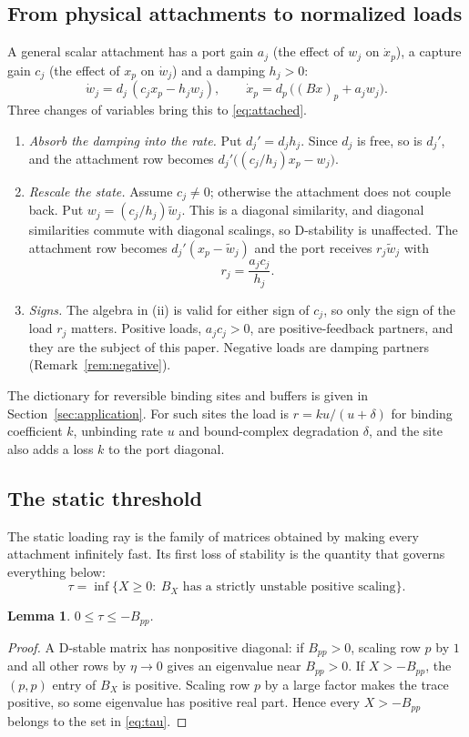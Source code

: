 \documentclass[11pt,a4paper]{article}
\theoremstyle{plain}
\newtheorem{lemma}[theorem]{Lemma}
\theoremstyle{definition}
\theoremstyle{remark}
\begin{document}
\subsection{From physical attachments to normalized loads}\label{sec:normalization}
A general scalar attachment has a port gain $a_j$ (the effect of $w_j$ on
$\dot x_p$), a capture gain $c_j$ (the effect of $x_p$ on $\dot w_j$) and a
damping $h_j>0$:
\[
 \dot w_j=d_j\,(c_jx_p-h_jw_j),\qquad \dot x_p=d_p\,\bigl((Bx)_p+a_jw_j\bigr).
\]
Three changes of variables bring this to \eqref{eq:attached}.
\begin{enumerate}[label=(\roman*)]
\item \emph{Absorb the damping into the rate.} Put $d_j'=d_jh_j$. Since $d_j$
is free, so is $d_j'$, and the attachment row becomes
$d_j'\bigl((c_j/h_j)x_p-w_j\bigr)$.
\item \emph{Rescale the state.} Assume $c_j\ne0$; otherwise the attachment
does not couple back. Put $w_j=(c_j/h_j)\tilde w_j$. This is a
diagonal similarity, and diagonal similarities commute with diagonal scalings,
so D-stability is unaffected. The attachment row becomes
$d_j'(x_p-\tilde w_j)$ and the port receives $r_j\tilde w_j$ with
\[
 r_j=\frac{a_jc_j}{h_j}.
\]
\item \emph{Signs.} The algebra in (ii) is valid for either sign of $c_j$, so
only the sign of the load $r_j$ matters. Positive loads,
$a_jc_j>0$, are positive-feedback partners, and they are the subject of this
paper. Negative loads are damping partners (Remark~\ref{rem:negative}).
\end{enumerate}
The dictionary for reversible binding sites and buffers is given in
Section~\ref{sec:application}. For such sites the load is
$r=ku/(u+\delta)$ for binding coefficient $k$, unbinding rate $u$ and
bound-complex degradation $\delta$, and the site also adds a loss $k$ to the
port diagonal.

\subsection{The static threshold}
The static loading ray is the family of matrices obtained by making every
attachment infinitely fast. Its first loss of stability is the quantity that
governs everything below:
\begin{equation}\label{eq:tau}
 \tau=\inf\{X\ge0:\ B_X\text{ has a strictly unstable positive scaling}\}.
\end{equation}

\begin{lemma}\label{lem:taubound}
$0\le\tau\le-B_{pp}$.
\end{lemma}
\begin{proof}
A D-stable matrix has nonpositive diagonal: if $B_{pp}>0$, scaling row $p$ by
$1$ and all other rows by $\eta\to0$ gives an eigenvalue near $B_{pp}>0$. If
$X>-B_{pp}$, the $(p,p)$ entry of $B_X$ is positive. Scaling row $p$ by a large
factor makes the trace positive, so some eigenvalue has positive real part.
Hence every $X>-B_{pp}$ belongs to the set in \eqref{eq:tau}.
\end{proof}
\end{document}
